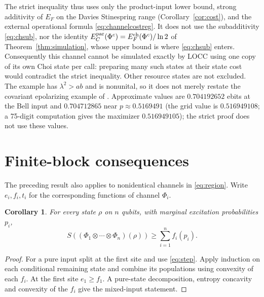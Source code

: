 \documentclass[11pt]{article}
\newtheorem{corollary}[theorem]{Corollary}
\begin{document}
The strict inequality thus uses only the product-input lower bound, strong additivity of $E_F$ on the Davies Stinespring range (Corollary~\ref{cor:cost}), and the external operational formula \eqref{eq:channelcostreg}. It does not use the subadditivity \eqref{eq:chsub}, nor the identity $E_C^{\rm par}(\Phi^c)=E_F^{\rm ch}(\Phi^c)/\ln2$ of Theorem~\ref{thm:simulation}, whose upper bound is where \eqref{eq:chsub} enters.
Consequently this channel cannot be simulated exactly by LOCC using one
copy of its own Choi state per call: preparing many such states at their
state cost would contradict the strict inequality. Other resource states
are not excluded. The example has $\lambda^2>ab$ and is nonunital, so it
does not merely restate the covariant epolarizing example of \cite{wilde}.
Approximate values are $0.704192652$ ebits at the Bell input and
$0.704712865$ near $p\approx0.5169491$ (the grid value is $0.516949108$; a 75-digit computation gives the maximizer $0.516949105$); the strict proof does not use these values.

\section{Finite-block consequences}
The preceding result also applies to nonidentical channels in \eqref{eq:region}. Write $e_i,f_i,t_i$ for the corresponding functions of channel $\Phi_i$.

\begin{corollary}\label{cor:multi}
For every state $\rho$ on $n$ qubits, with marginal excitation probabilities $p_i$,
\[
 S((\Phi_1\otimes\cdots\otimes\Phi_n)(\rho))
 \ge \sum_{i=1}^n f_i(p_i).
\]
\end{corollary}
\begin{proof}
For a pure input split at the first site and use \eqref{eq:step}. Apply induction on each conditional remaining state and combine its populations using convexity of each $f_i$. At the first site $e_1\ge f_1$. A pure-state decomposition, entropy concavity and convexity of the $f_i$ give the mixed-input statement.
\end{proof}
\end{document}
